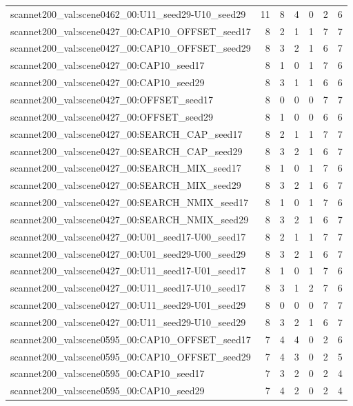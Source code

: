 \begin{table}[t]
\begin{tabular}{lrrrrrr}
scannet200\_val:scene0462\_00:U11\_seed29-U10\_seed29 & 11 & 8 & 4 & 0 & 2 & 6 \\
scannet200\_val:scene0427\_00:CAP10\_OFFSET\_seed17 & 8 & 2 & 1 & 1 & 7 & 7 \\
scannet200\_val:scene0427\_00:CAP10\_OFFSET\_seed29 & 8 & 3 & 2 & 1 & 6 & 7 \\
scannet200\_val:scene0427\_00:CAP10\_seed17 & 8 & 1 & 0 & 1 & 7 & 6 \\
scannet200\_val:scene0427\_00:CAP10\_seed29 & 8 & 3 & 1 & 1 & 6 & 6 \\
scannet200\_val:scene0427\_00:OFFSET\_seed17 & 8 & 0 & 0 & 0 & 7 & 7 \\
scannet200\_val:scene0427\_00:OFFSET\_seed29 & 8 & 1 & 0 & 0 & 6 & 6 \\
scannet200\_val:scene0427\_00:SEARCH\_CAP\_seed17 & 8 & 2 & 1 & 1 & 7 & 7 \\
scannet200\_val:scene0427\_00:SEARCH\_CAP\_seed29 & 8 & 3 & 2 & 1 & 6 & 7 \\
scannet200\_val:scene0427\_00:SEARCH\_MIX\_seed17 & 8 & 1 & 0 & 1 & 7 & 6 \\
scannet200\_val:scene0427\_00:SEARCH\_MIX\_seed29 & 8 & 3 & 2 & 1 & 6 & 7 \\
scannet200\_val:scene0427\_00:SEARCH\_NMIX\_seed17 & 8 & 1 & 0 & 1 & 7 & 6 \\
scannet200\_val:scene0427\_00:SEARCH\_NMIX\_seed29 & 8 & 3 & 2 & 1 & 6 & 7 \\
scannet200\_val:scene0427\_00:U01\_seed17-U00\_seed17 & 8 & 2 & 1 & 1 & 7 & 7 \\
scannet200\_val:scene0427\_00:U01\_seed29-U00\_seed29 & 8 & 3 & 2 & 1 & 6 & 7 \\
scannet200\_val:scene0427\_00:U11\_seed17-U01\_seed17 & 8 & 1 & 0 & 1 & 7 & 6 \\
scannet200\_val:scene0427\_00:U11\_seed17-U10\_seed17 & 8 & 3 & 1 & 2 & 7 & 6 \\
scannet200\_val:scene0427\_00:U11\_seed29-U01\_seed29 & 8 & 0 & 0 & 0 & 7 & 7 \\
scannet200\_val:scene0427\_00:U11\_seed29-U10\_seed29 & 8 & 3 & 2 & 1 & 6 & 7 \\
scannet200\_val:scene0595\_00:CAP10\_OFFSET\_seed17 & 7 & 4 & 4 & 0 & 2 & 6 \\
scannet200\_val:scene0595\_00:CAP10\_OFFSET\_seed29 & 7 & 4 & 3 & 0 & 2 & 5 \\
scannet200\_val:scene0595\_00:CAP10\_seed17 & 7 & 3 & 2 & 0 & 2 & 4 \\
scannet200\_val:scene0595\_00:CAP10\_seed29 & 7 & 4 & 2 & 0 & 2 & 4 \\

\end{tabular}
\end{table}
